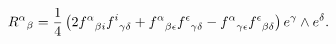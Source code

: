 \begin{equation}{R^\alpha}_\beta ={1\over 4} 
\left(2{f^\alpha}_{\beta i}{f^i}_{\gamma\delta}
+{f^\alpha}_{\beta\epsilon}{f^\epsilon}_{\gamma\delta}
-{f^\alpha}_{\gamma\epsilon}{f^\epsilon}_{\beta\delta}
\right)e^\gamma\wedge e^\delta.
\label{fab}
\end{equation}

